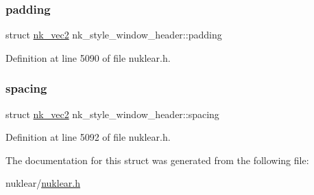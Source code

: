 \subsubsection{\texorpdfstring{padding}{padding}}
{\footnotesize\ttfamily struct \mbox{\hyperlink{structnk__vec2}{nk\+\_\+vec2}} nk\+\_\+style\+\_\+window\+\_\+header\+::padding}



Definition at line 5090 of file nuklear.\+h.

\mbox{\label{structnk__style__window__header_a590cfd4a72e89b1fba9b3b966bf8ef5c}} 
\subsubsection{\texorpdfstring{spacing}{spacing}}
{\footnotesize\ttfamily struct \mbox{\hyperlink{structnk__vec2}{nk\+\_\+vec2}} nk\+\_\+style\+\_\+window\+\_\+header\+::spacing}



Definition at line 5092 of file nuklear.\+h.



The documentation for this struct was generated from the following file\+:\begin{DoxyCompactItemize}
\item 
nuklear/\mbox{\hyperlink{nuklear_8h}{nuklear.\+h}}\end{DoxyCompactItemize}
